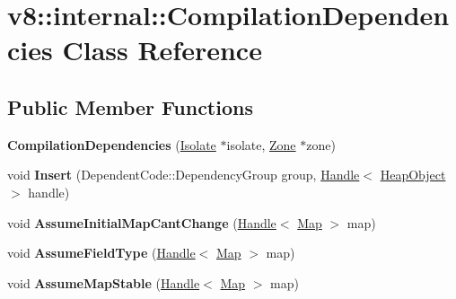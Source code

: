\hypertarget{classv8_1_1internal_1_1_compilation_dependencies}{}\section{v8\+:\+:internal\+:\+:Compilation\+Dependencies Class Reference}
\label{classv8_1_1internal_1_1_compilation_dependencies}
\subsection*{Public Member Functions}
\begin{DoxyCompactItemize}
\item 
{\bfseries Compilation\+Dependencies} (\hyperlink{classv8_1_1internal_1_1_isolate}{Isolate} $\ast$isolate, \hyperlink{classv8_1_1internal_1_1_zone}{Zone} $\ast$zone)\hypertarget{classv8_1_1internal_1_1_compilation_dependencies_aa18c7a9655d489df19da85a146fe7942}{}\label{classv8_1_1internal_1_1_compilation_dependencies_aa18c7a9655d489df19da85a146fe7942}

\item 
void {\bfseries Insert} (Dependent\+Code\+::\+Dependency\+Group group, \hyperlink{classv8_1_1internal_1_1_handle}{Handle}$<$ \hyperlink{classv8_1_1internal_1_1_heap_object}{Heap\+Object} $>$ handle)\hypertarget{classv8_1_1internal_1_1_compilation_dependencies_aaf427cf738589754ae28c7fe7127ca12}{}\label{classv8_1_1internal_1_1_compilation_dependencies_aaf427cf738589754ae28c7fe7127ca12}

\item 
void {\bfseries Assume\+Initial\+Map\+Cant\+Change} (\hyperlink{classv8_1_1internal_1_1_handle}{Handle}$<$ \hyperlink{classv8_1_1internal_1_1_map}{Map} $>$ map)\hypertarget{classv8_1_1internal_1_1_compilation_dependencies_ae0f8baefc2e92f91314b32adf45df730}{}\label{classv8_1_1internal_1_1_compilation_dependencies_ae0f8baefc2e92f91314b32adf45df730}

\item 
void {\bfseries Assume\+Field\+Type} (\hyperlink{classv8_1_1internal_1_1_handle}{Handle}$<$ \hyperlink{classv8_1_1internal_1_1_map}{Map} $>$ map)\hypertarget{classv8_1_1internal_1_1_compilation_dependencies_ae9693332a8623ef1c2f7096d64156e70}{}\label{classv8_1_1internal_1_1_compilation_dependencies_ae9693332a8623ef1c2f7096d64156e70}

\item 
void {\bfseries Assume\+Map\+Stable} (\hyperlink{classv8_1_1internal_1_1_handle}{Handle}$<$ \hyperlink{classv8_1_1internal_1_1_map}{Map} $>$ map)\hypertarget{classv8_1_1internal_1_1_compilation_dependencies_ae65876811d03b5ec2aae72720050733d}{}\label{classv8_1_1internal_1_1_compilation_dependencies_ae65876811d03b5ec2aae72720050733d}


\end{DoxyCompactItemize}
